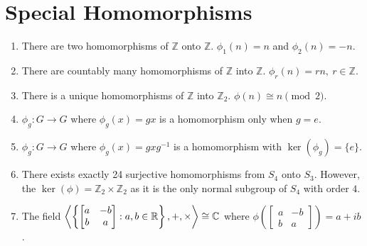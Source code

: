 \section{Special Homomorphisms}
\begin{enumerate}
	\item There are  two homomorphisms of $\mathbb{Z}$ onto $\mathbb{Z}$. $\phi_1(n) = n$ and $\phi_2(n) = -n$.
	\item There are countably many homomorphisms of $\mathbb{Z}$ into $\mathbb{Z}$. $\phi_r(n) = rn,\ r \in \mathbb{Z}$.
	\item There is a unique homomorphisms of $\mathbb{Z}$ into $\mathbb{Z}_2$. $\phi(n) \cong n \pmod{2}$.
	\item $\phi_g : G \to G$ where $\phi_g(x) = gx$ is a homomorphism only when $g = e$.
	\item $\phi_g : G \to G$ where $\phi_g(x) = gxg^{-1}$ is a homomorphism with $\ker(\phi_g) = \{ e \}$.
	\item There exists exactly 24 surjective homomorphisms from $S_4$ onto $S_3$. However, the $\ker(\phi) = \mathbb{Z}_2 \times \mathbb{Z}_2$ as it is the only normal subgroup of $S_4$ with order $4$.
	\item The field $\left\langle \left\{\begin{bmatrix} a & -b \\ b & a \end{bmatrix} : a,b \in \mathbb{R} \right\},+,\times \right\rangle \cong \mathbb{C}$ where $\phi\left(\begin{bmatrix} a & -b \\ b & a \end{bmatrix}\right) = a+ib$.
\end{enumerate}

